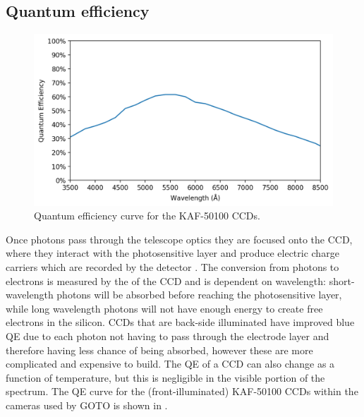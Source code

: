 \begin{colsection}
\begin{colsection}
\end{colsection}

\newpage
\subsection{Quantum efficiency}
\label{sec:qe}
\begin{colsection}

\begin{figure}[t]
    \begin{center}
        \includegraphics[width=\textwidth]{images/throughput/qe.png}
    \end{center}
    \caption[CCD quantum efficiency curve]{
        Quantum efficiency curve for the KAF-50100 CCDs.
    }\label{fig:qe}
\end{figure}

Once photons pass through the telescope optics they are focused onto the CCD, where they interact with the photosensitive layer and produce electric charge carriers which are recorded by the detector \citep{CCDs}. The conversion from photons to electrons is measured by the  of the CCD and is dependent on wavelength: short-wavelength photons will be absorbed before reaching the photosensitive layer, while long wavelength photons will not have enough energy to create free electrons in the silicon. CCDs that are back-side illuminated have improved blue QE due to each photon not having to pass through the electrode layer and therefore having less chance of being absorbed, however these are more complicated and expensive to build. The QE of a CCD can also change as a function of temperature, but this is negligible in the visible portion of the spectrum. The QE curve for the (front-illuminated) KAF-50100 CCDs within the cameras used by GOTO is shown in .


\end{colsection}
\end{colsection}
